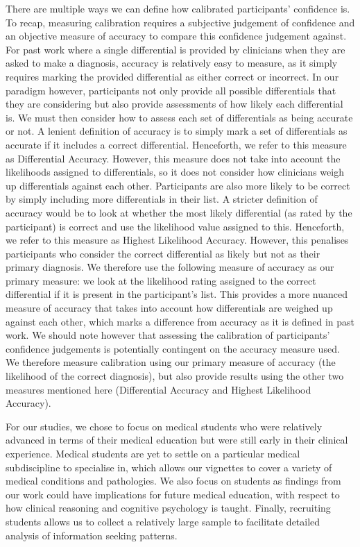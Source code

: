 \documentclass[a4paper, nobind]{templates/ociamthesis}
\begin{document}
\hfill\break
There are multiple ways we can define how calibrated participants' confidence is. To recap, measuring calibration requires a subjective judgement of confidence and an objective measure of accuracy to compare this confidence judgement against. For past work where a single differential is provided by clinicians when they are asked to make a diagnosis, accuracy is relatively easy to measure, as it simply requires marking the provided differential as either correct or incorrect. In our paradigm however, participants not only provide all possible differentials that they are considering but also provide assessments of how likely each differential is. We must then consider how to assess each set of differentials as being accurate or not. A lenient definition of accuracy is to simply mark a set of differentials as accurate if it includes a correct differential. Henceforth, we refer to this measure as Differential Accuracy. However, this measure does not take into account the likelihoods assigned to differentials, so it does not consider how clinicians weigh up differentials against each other. Participants are also more likely to be correct by simply including more differentials in their list. A stricter definition of accuracy would be to look at whether the most likely differential (as rated by the participant) is correct and use the likelihood value assigned to this. Henceforth, we refer to this measure as Highest Likelihood Accuracy. However, this penalises participants who consider the correct differential as likely but not as their primary diagnosis. We therefore use the following measure of accuracy as our primary measure: we look at the likelihood rating assigned to the correct differential if it is present in the participant's list. This provides a more nuanced measure of accuracy that takes into account how differentials are weighed up against each other, which marks a difference from accuracy as it is defined in past work. We should note however that assessing the calibration of participants' confidence judgements is potentially contingent on the accuracy measure used. We therefore measure calibration using our primary measure of accuracy (the likelihood of the correct diagnosis), but also provide results using the other two measures mentioned here (Differential Accuracy and Highest Likelihood Accuracy).

\hfill\break
For our studies, we chose to focus on medical students who were relatively advanced in terms of their medical education but were still early in their clinical experience. Medical students are yet to settle on a particular medical subdiscipline to specialise in, which allows our vignettes to cover a variety of medical conditions and pathologies. We also focus on students as findings from our work could have implications for future medical education, with respect to how clinical reasoning and cognitive psychology is taught. Finally, recruiting students allows us to collect a relatively large sample to facilitate detailed analysis of information seeking patterns.\\
\end{document}
